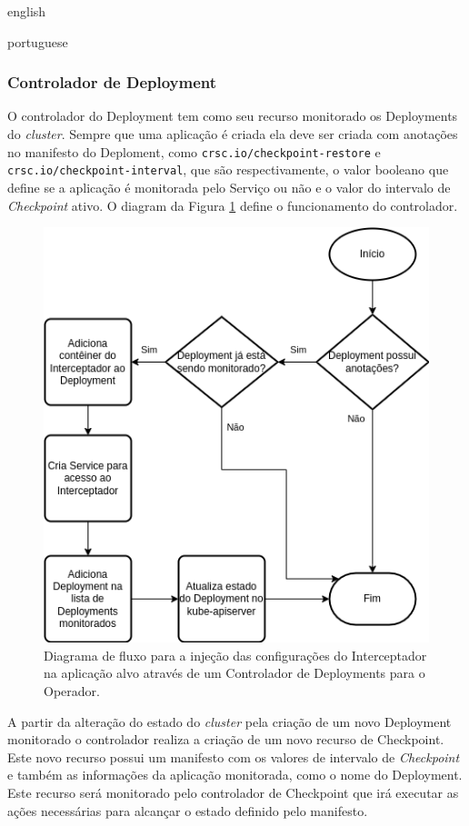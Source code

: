 \begin{otherlanguage*}{english}
\begin{otherlanguage*}{portuguese}
\subsubsection{Controlador de Deployment}

O controlador do Deployment tem como seu recurso monitorado os Deployments do
\textit{cluster}. Sempre que uma aplicação é criada ela deve ser criada com anotações
no manifesto do Deploment, como \texttt{crsc.io/checkpoint-restore} e
\texttt{crsc.io/checkpoint-interval}, que são respectivamente, o valor booleano que
define se a aplicação é monitorada pelo Serviço ou não e o valor do intervalo de
\textit{Checkpoint} ativo. O diagram da Figura \ref{fig:deployment-controller-diagram}
define o funcionamento do controlador.

\begin{figure}[h]
\centering
\includegraphics[scale=0.8]{images/deployment-controller.png}
\caption{Diagrama de fluxo para a injeção das configurações do Interceptador na aplicação alvo através de um Controlador de Deployments para o Operador.}
\label{fig:deployment-controller-diagram}
\end{figure}

A partir da alteração do estado do \textit{cluster} pela criação de um novo Deployment
monitorado o controlador realiza a criação de um novo recurso de Checkpoint. Este novo
recurso possui um manifesto com os valores de intervalo de \textit{Checkpoint} e também
as informações da aplicação monitorada, como o nome do Deployment. Este recurso será 
monitorado pelo controlador de Checkpoint que irá executar as ações necessárias para
alcançar o estado definido pelo manifesto.


\end{otherlanguage*}
\end{otherlanguage*}
